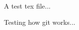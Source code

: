 \documentclass{article}
\title{}
\date{}
\author{}
\begin{document}
\maketitle

A test tex file...

Testing how git works...
\end{document}
